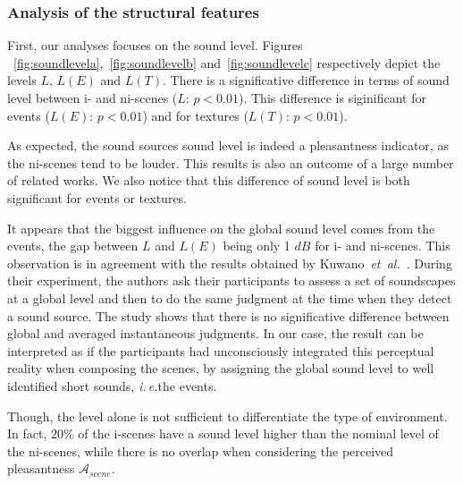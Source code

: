 \documentclass[preprint,12pt]{elsarticle}
\newcommand{\ie}{\emph{i.\,e.}}
\newcommand{\al}{\emph{et~al.}}
\begin{document}
\subsubsection*{Analysis of the structural features}

First, our analyses focuses on the sound level. Figures ~\ref{fig:soundlevela},~\ref{fig:soundlevelb} and~\ref{fig:soundlevelc} respectively depict the levels $L$, $L(E)$ and $L(T)$. There is a significative difference in terms of sound level between i- and ni-scenes ($L$: $p<0.01$). This difference is siginificant for events ($L(E)$: $p<0.01$) and for textures ($L(T)$: $p<0.01$).

As expected, the sound sources sound level is indeed a pleasantness indicator, as the ni-scenes tend to be louder. This results is also an outcome of a large number of related works. We also notice that this difference of sound level is both significant for events or textures.

It appears that the biggest influence on the global sound level comes from the events, the gap between $L$ and $L(E)$ being only 1 $dB$ for i- and ni-scenes. This observation is in agreement with the results obtained by Kuwano~\al~\cite{kuwano_memory_2003}. During their experiment, the authors ask their participants to assess a set of soundscapes at a global level and then to do the same judgment at the time when they detect a sound source. The study shows that there is no significative difference between global and averaged instantaneous judgments. In our case, the result can be interpreted as if the participants had unconsciously integrated this perceptual reality when composing the scenes, by assigning the global sound level to well identified short sounds, \ie the events.

Though, the level alone is not sufficient to differentiate the type of environment. In fact, $20\%$ of the i-scenes have a sound level higher than the nominal level of the ni-scenes, while there is no overlap when considering the perceived pleasantness $\mathcal{A}_{scene}$.
\end{document}
